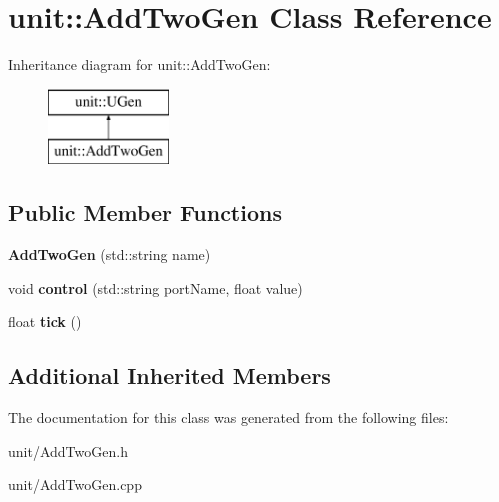 \hypertarget{classunit_1_1AddTwoGen}{}\section{unit\+:\+:Add\+Two\+Gen Class Reference}
\label{classunit_1_1AddTwoGen}
Inheritance diagram for unit\+:\+:Add\+Two\+Gen\+:\begin{figure}[H]
\begin{center}
\leavevmode
\includegraphics[height=2.000000cm]{classunit_1_1AddTwoGen}
\end{center}
\end{figure}
\subsection*{Public Member Functions}
\begin{DoxyCompactItemize}
\item 
{\bfseries Add\+Two\+Gen} (std\+::string name)\hypertarget{classunit_1_1AddTwoGen_a6feb4da948f12b37eb4502899b5a4311}{}\label{classunit_1_1AddTwoGen_a6feb4da948f12b37eb4502899b5a4311}

\item 
void {\bfseries control} (std\+::string port\+Name, float value)\hypertarget{classunit_1_1AddTwoGen_a5e0a82722566595b7284386a618ef3cb}{}\label{classunit_1_1AddTwoGen_a5e0a82722566595b7284386a618ef3cb}

\item 
float {\bfseries tick} ()\hypertarget{classunit_1_1AddTwoGen_a8e667f4f6c6849faef9f07a62e779d9a}{}\label{classunit_1_1AddTwoGen_a8e667f4f6c6849faef9f07a62e779d9a}

\end{DoxyCompactItemize}
\subsection*{Additional Inherited Members}


The documentation for this class was generated from the following files\+:\begin{DoxyCompactItemize}
\item 
unit/Add\+Two\+Gen.\+h\item 
unit/Add\+Two\+Gen.\+cpp\end{DoxyCompactItemize}
